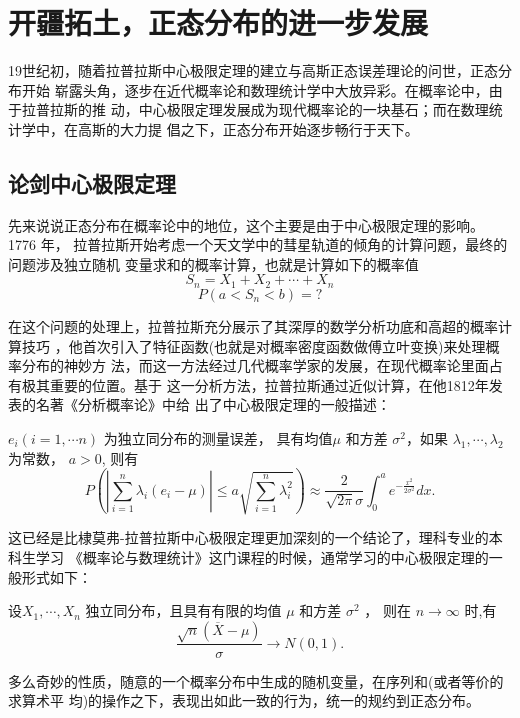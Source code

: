 \section{开疆拓土，正态分布的进一步发展}

19世纪初，随着拉普拉斯中心极限定理的建立与高斯正态误差理论的问世，正态分布开始
崭露头角，逐步在近代概率论和数理统计学中大放异彩。在概率论中，由于拉普拉斯的推
动，中心极限定理发展成为现代概率论的一块基石；而在数理统计学中，在高斯的大力提
倡之下，正态分布开始逐步畅行于天下。

\subsection{论剑中心极限定理}

先来说说正态分布在概率论中的地位，这个主要是由于中心极限定理的影响。 1776 年，
拉普拉斯开始考虑一个天文学中的彗星轨道的倾角的计算问题，最终的问题涉及独立随机
变量求和的概率计算，也就是计算如下的概率值
$$ S_n = X_1 + X_2 + \cdots + X_n  $$
$$P(a < S_n < b) = ? $$

在这个问题的处理上，拉普拉斯充分展示了其深厚的数学分析功底和高超的概率计算技巧
，他首次引入了特征函数(也就是对概率密度函数做傅立叶变换)来处理概率分布的神妙方
法，而这一方法经过几代概率学家的发展，在现代概率论里面占有极其重要的位置。基于
这一分析方法，拉普拉斯通过近似计算，在他1812年发表的名著《分析概率论》中给
出了中心极限定理的一般描述：

\begin{theorem}[拉普拉斯, 1812] $ e_i (i=1, \cdots n)$ 为独立同分布的测量误差，
具有均值$\mu$ 和方差 $\sigma^2$，如果 $\lambda_1, \cdots, \lambda_2$ 为常数，
$a>0$, 则有
$$ \displaystyle P\left(\left|\sum_{i=1}^n \lambda_i(e_i - \mu)\right|
\le a \sqrt{\sum_{i=1}^n \lambda_i^2}\right)
\approx \frac{2}{\sqrt{2\pi}\sigma} \int_0^a e^{-\frac{x^2}{2\sigma^2}} dx . $$
\end{theorem}

这已经是比棣莫弗-拉普拉斯中心极限定理更加深刻的一个结论了，理科专业的本科生学习
《概率论与数理统计》这门课程的时候，通常学习的中心极限定理的一般形式如下：

\begin{theorem}
设$X_1,\cdots, X_n$ 独立同分布，且具有有限的均值 $\mu$ 和方差 $\sigma^2$ ，
则在 $n \rightarrow \infty$ 时,有
$$ \displaystyle \frac{\sqrt{n}(\overline{X} - \mu)}{\sigma}  \rightarrow  N(0,1) .$$
\end{theorem}

多么奇妙的性质，随意的一个概率分布中生成的随机变量，在序列和(或者等价的求算术平
均)的操作之下，表现出如此一致的行为，统一的规约到正态分布。

